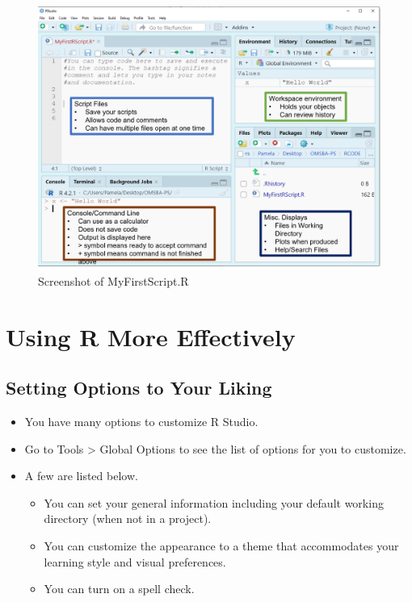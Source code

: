 \documentclass[
  letterpaper,
  DIV=11,
  numbers=noendperiod]{scrreprt}
\providecommand{\tightlist}{%
  \setlength{\itemsep}{0pt}\setlength{\parskip}{0pt}}\usepackage{longtable,booktabs,array}
\begin{document}
\begin{figure}[H]

{\centering \includegraphics{Pictures/Ch0/MyFirstScript.png}

}

\caption{Screenshot of MyFirstScript.R}

\end{figure}%


\chapter{Using R More Effectively}\label{using-r-more-effectively}

\section{Setting Options to Your
Liking}\label{setting-options-to-your-liking}

\begin{itemize}
\tightlist
\item
  You have many options to customize R Studio.
\item
  Go to Tools \textgreater{} Global Options to see the list of options
  for you to customize.
\item
  A few are listed below.

  \begin{itemize}
  \tightlist
  \item
    You can set your general information including your default working
    directory (when not in a project).
  \item
    You can customize the appearance to a theme that accommodates your
    learning style and visual preferences.
  \item
    You can turn on a spell check.
  \end{itemize}
\end{itemize}
\end{document}
